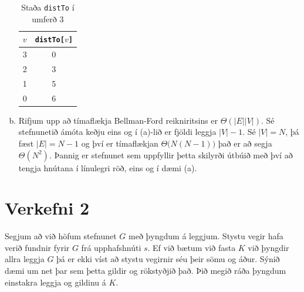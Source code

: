 \documentclass[12pt, a4paper, hidelinks]{article}
\begin{document}
\begin{enumerate}[(a)]
    \begin{table}[H]
        \centering
        \caption{Staða \texttt{distTo} í umferð 3}
        \begin{tabular}{lc}
            \toprule
            $v$ & \texttt{distTo[$v$]} \\
            \midrule
            3   & 0        \\
            2   & 3         \\
            1   & 5 \\
            0   & 6 \\
            \bottomrule
        \end{tabular}
        \label{tab:my_label}
    \end{table}
    
    \item Rifjum upp að tímaflækja Bellman-Ford reikniritsins er $\Theta(|E||V|)$. Sé stefnunetið ámóta keðju eins og í (a)-lið er fjöldi leggja $|V| - 1$. Sé $|V| = N$, þá fæst $|E| = N - 1$ og því er tímaflækjan
    $\Theta\big(N(N - 1)\big)$ það er að segja $\Theta(N^2)$. Þannig er stefnunet sem uppfyllir þetta skilyrði útbúið með því að tengja hnútana í línulegri röð, eins og í dæmi (a).
\end{enumerate}

\newpage

\section*{Verkefni 2}
Segjum að við höfum stefnunet $G$ með þyngdum á leggjum. Stystu vegir hafa verið fundnir fyrir $G$ frá upphafshnúti $s$. Ef við bætum við fasta $K$ við þyngdir allra leggja $G$ þá er ekki víst að stystu vegirnir séu þeir sömu og áður. Sýnið dæmi um net þar sem þetta gildir og rökstyðjið það. Þið megið ráða þyngdum einstakra leggja og gildinu á $K$.
\end{document}
